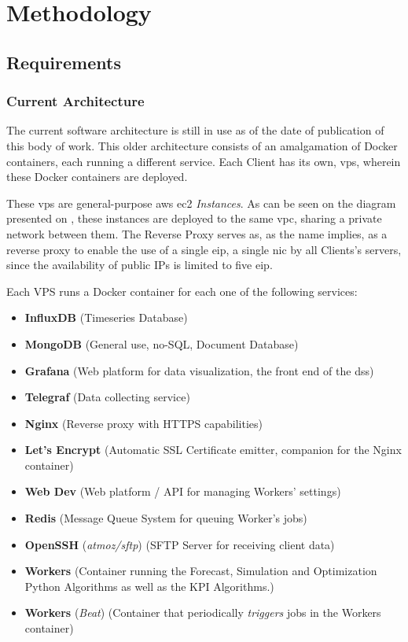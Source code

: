 \chapter{Methodology}
\label{methodology}

\section{Requirements}
\label{methodology:s:requirements}

\subsection{Current Architecture}
\label{methodology:ss:current-architecture}

The current software architecture is still in use as of the date of publication of this body of work. This older architecture consists of an amalgamation of Docker containers, each running a different service. Each Client has its own, \gls{vps}, wherein these Docker containers are deployed. 

These \gls{vps} are general-purpose \gls{aws} \gls{ec2} \textit{Instances}. As can be seen on the diagram presented on , these instances are deployed to the same \gls{vpc}, sharing a private network between them. The Reverse Proxy serves as, as the name implies, as a reverse proxy to enable the use of a single \gls{eip}, a single \gls{nic} by all Clients's servers, since the availability of public IPs is limited to five \gls{eip}.


Each VPS runs a Docker container for each one of the following services:

\begin{itemize}

\item \textbf{InfluxDB} (Timeseries Database)
\item \textbf{MongoDB} (General use, no-SQL, Document Database)
\item \textbf{Grafana} (Web platform for data visualization, the front end of the \gls{dss})
\item \textbf{Telegraf} (Data collecting service)
\item \textbf{Nginx} (Reverse proxy with HTTPS capabilities)
\item \textbf{Let's Encrypt} (Automatic SSL Certificate emitter, companion for the Nginx container)
\item \textbf{Web Dev} (Web platform / API for managing Workers' settings)
\item \textbf{Redis} (Message Queue System for queuing Worker's jobs)
\item \textbf{OpenSSH} (\textit{atmoz/sftp}) (SFTP Server for receiving client data)
\item \textbf{Workers} (Container running the Forecast, Simulation and Optimization Python Algorithms as well as the KPI Algorithms.)
\item \textbf{Workers} (\textit{Beat}) (Container that periodically \textit{triggers} jobs in the Workers container)

\end{itemize}

